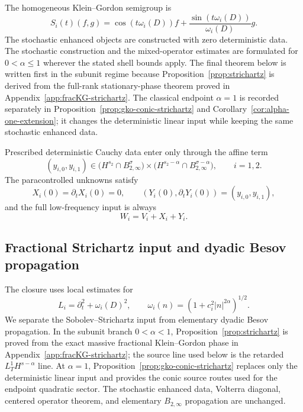 \documentclass[10pt]{amsart}
\numberwithin{equation}{section}
\theoremstyle{plain}
\theoremstyle{definition}
\theoremstyle{remark}
\newcommand{\Btwo}{B_{2,\infty}}
\begin{document}
The homogeneous Klein--Gordon semigroup is
\begin{equation}\label{eq:T-semigroup}
S_i(t)(f,g)=\cos(t\omega_i(D))f+
\frac{\sin(t\omega_i(D))}{\omega_i(D)}g.
\end{equation}
The stochastic enhanced objects are constructed with zero deterministic data.  The stochastic construction and the mixed-operator estimates are formulated for $0<\alpha\le1$ wherever the stated shell bounds apply.  The final theorem below is written first in the subunit regime because Proposition~\ref{prop:strichartz} is derived from the full-rank stationary-phase theorem proved in Appendix~\ref{app:fracKG-strichartz}.  The classical endpoint $\alpha=1$ is recorded separately in Proposition~\ref{prop:gko-conic-strichartz} and Corollary~\ref{cor:alpha-one-extension}; it changes the deterministic linear input while keeping the same stochastic enhanced data.

Prescribed deterministic Cauchy data enter only through the affine term
\begin{equation}\label{eq:Y-initial-data}
  (y_{i,0},y_{i,1})\in
  \bigl(H^{s_2}\cap\Btwo^\sigma\bigr)\times
  \bigl(H^{s_2-\alpha}\cap\Btwo^{\sigma-\alpha}\bigr),
  \qquad i=1,2.
\end{equation}
The paracontrolled unknowns satisfy
\begin{equation}\label{eq:XY-initial-data}
  X_i(0)=\partial_tX_i(0)=0,
  \qquad
  (Y_i(0),\partial_tY_i(0))=(y_{i,0},y_{i,1}),
\end{equation}
and the full low-frequency input is always
\begin{equation}\label{eq:full-input-no-Z}
  W_i=V_i+X_i+Y_i.
\end{equation}


\subsection{Fractional Strichartz input and dyadic Besov propagation}
The closure uses local estimates for
\[
 L_i=\partial_t^2+\omega_i(D)^2,
 \qquad
 \omega_i(n)=(1+c_i^2|n|^{2\alpha})^{1/2}.
\]
We separate the Sobolev--Strichartz input from elementary dyadic Besov propagation.  In the subunit branch $0<\alpha<1$, Proposition~\ref{prop:strichartz} is proved from the exact massive fractional Klein--Gordon phase in Appendix~\ref{app:fracKG-strichartz}; the source line used below is the retarded $L_T^1H^{s-\alpha}$ line.  At $\alpha=1$, Proposition~\ref{prop:gko-conic-strichartz} replaces only the deterministic linear input and provides the conic source routes used for the endpoint quadratic sector.  The stochastic enhanced data, Volterra diagonal, centered operator theorem, and elementary $B_{2,\infty}$ propagation are unchanged.
\end{document}

